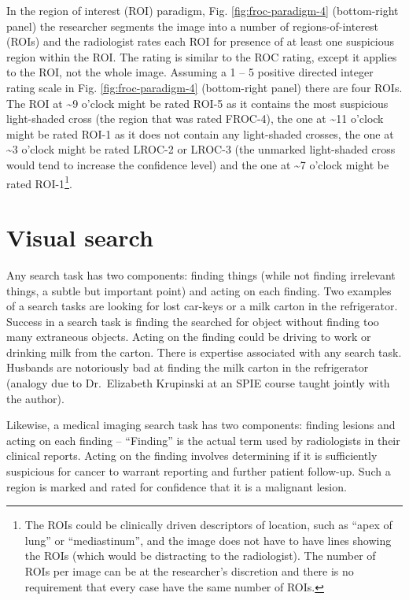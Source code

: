 \documentclass[
]{book}
\begin{document}
\begin{itemize}
  In the region of interest (ROI) paradigm, Fig. \ref{fig:froc-paradigm-4} (bottom-right panel) the researcher segments the image into a number of regions-of-interest (ROIs) and the radiologist rates each ROI for presence of at least one suspicious region within the ROI. The rating is similar to the ROC rating, except it applies to the ROI, not the whole image. Assuming a 1 -- 5 positive directed integer rating scale in Fig. \ref{fig:froc-paradigm-4} (bottom-right panel) there are four ROIs. The ROI at \textasciitilde9 o'clock might be rated ROI-5 as it contains the most suspicious light-shaded cross (the region that was rated FROC-4), the one at \textasciitilde11 o'clock might be rated ROI-1 as it does not contain any light-shaded crosses, the one at \textasciitilde3 o'clock might be rated LROC-2 or LROC-3 (the unmarked light-shaded cross would tend to increase the confidence level) and the one at \textasciitilde7 o'clock might be rated ROI-1\footnote{The ROIs could be clinically driven descriptors of location, such as ``apex of lung'' or ``mediastinum'', and the image does not have to have lines showing the ROIs (which would be distracting to the radiologist). The number of ROIs per image can be at the researcher's discretion and there is no requirement that every case have the same number of ROIs.}.
\end{itemize}

\hypertarget{froc-paradigm-vis-search}{%
\section{Visual search}\label{froc-paradigm-vis-search}}

Any search task has two components: finding things (while not finding irrelevant things, a subtle but important point) and acting on each finding. Two examples of a search tasks are looking for lost car-keys or a milk carton in the refrigerator. Success in a search task is finding the searched for object without finding too many extraneous objects. Acting on the finding could be driving to work or drinking milk from the carton. There is expertise associated with any search task. Husbands are notoriously bad at finding the milk carton in the refrigerator (analogy due to Dr.~Elizabeth Krupinski at an SPIE course taught jointly with the author).

Likewise, a medical imaging search task has two components: finding lesions and acting on each finding -- ``Finding'' is the actual term used by radiologists in their clinical reports. Acting on the finding involves determining if it is sufficiently suspicious for cancer to warrant reporting and further patient follow-up. Such a region is marked and rated for confidence that it is a malignant lesion.
\end{document}

